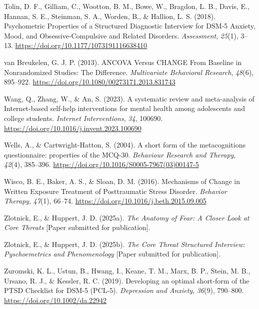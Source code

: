 \documentclass[
  man,floatsintext]{apa7}
\newlength{\cslhangindent}
\newlength{\cslentryspacingunit} %
\newenvironment{CSLReferences}[2] %
 {%
  \setlength{\parindent}{0pt}
  \ifodd #1
  \let\oldpar\par
  \def\par{\hangindent=\cslhangindent\oldpar}
  \fi
  \setlength{\parskip}{#2\cslentryspacingunit}
 }%
 {}
\begin{document}
\begin{CSLReferences}{1}{0}
\leavevmode{}%
Tolin, D. F., Gilliam, C., Wootton, B. M., Bowe, W., Bragdon, L. B., Davis, E., Hannan, S. E., Steinman, S. A., Worden, B., \& Hallion, L. S. (2018). Psychometric Properties of a Structured Diagnostic Interview for DSM-5 Anxiety, Mood, and Obsessive-Compulsive and Related Disorders. \emph{Assessment}, \emph{25}(1), 3--13. \url{https://doi.org/10.1177/1073191116638410}

\leavevmode{}%
van Breukelen, G. J. P. (2013). ANCOVA Versus CHANGE From Baseline in Nonrandomized Studies: The Difference. \emph{Multivariate Behavioral Research}, \emph{48}(6), 895--922. \url{https://doi.org/10.1080/00273171.2013.831743}

\leavevmode{}%
Wang, Q., Zhang, W., \& An, S. (2023). A systematic review and meta-analysis of Internet-based self-help interventions for mental health among adolescents and college students. \emph{Internet Interventions}, \emph{34}, 100690. \url{https://doi.org/10.1016/j.invent.2023.100690}

\leavevmode{}%
Wells, A., \& Cartwright-Hatton, S. (2004). A short form of the metacognitions questionnaire: properties of the MCQ-30. \emph{Behaviour Research and Therapy}, \emph{42}(4), 385--396. \url{https://doi.org/10.1016/S0005-7967(03)00147-5}

\leavevmode{}%
Wisco, B. E., Baker, A. S., \& Sloan, D. M. (2016). Mechanisms of Change in Written Exposure Treatment of Posttraumatic Stress Disorder. \emph{Behavior Therapy}, \emph{47}(1), 66--74. \url{https://doi.org/10.1016/j.beth.2015.09.005}

\leavevmode{}%
Zlotnick, E., \& Huppert, J. D. (2025a). \emph{The Anatomy of Fear: A Closer Look at Core Threats} {[}Paper submitted for publication{]}.

\leavevmode{}%
Zlotnick, E., \& Huppert, J. D. (2025b). \emph{The Core Threat Structured Interview: Pyschoemetrics and Phenomenology} {[}Paper submitted for publication{]}.

\leavevmode{}%
Zuromski, K. L., Ustun, B., Hwang, I., Keane, T. M., Marx, B. P., Stein, M. B., Ursano, R. J., \& Kessler, R. C. (2019). Developing an optimal short-form of the PTSD Checklist for DSM-5 (PCL-5). \emph{Depression and Anxiety}, \emph{36}(9), 790--800. \url{https://doi.org/10.1002/da.22942}

\end{CSLReferences}
\end{document}
